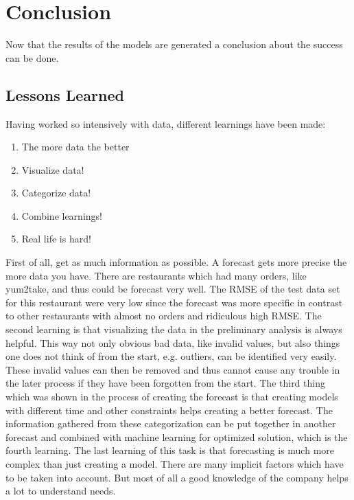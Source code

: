 \chapter{Conclusion}\label{chapter:Conclusion}
Now that the results of the models are generated a conclusion about the success can be done.
\section{Lessons Learned}
Having worked so intensively with data, different learnings have been made:

\begin{enumerate}
\item The more data the better
\item Visualize data!
\item Categorize data!
\item Combine learnings!
\item Real life is hard!
\end{enumerate}

First of all, get as much information as possible. A forecast gets more precise the more data you have. There are restaurants which had many orders, like yum2take, and thus could be forecast very well. The RMSE of the test data set for this restaurant were very low since the forecast was more specific in contrast to other restaurants with almost no orders and ridiculous high RMSE.\newline
The second learning is that visualizing the data in the preliminary analysis is always helpful. This way not only obvious bad data, like invalid values, but also things one does not think of from the start, e.g. outliers, can be identified very easily. These invalid values can then be removed and thus cannot cause any trouble in the later process if they have been forgotten from the start.\newline
The third thing which was shown in the process of creating the forecast is that creating models with different time and other constraints helps creating a better forecast. The information gathered from these categorization can be put together in another forecast and combined with machine learning for optimized solution, which is the fourth learning.\newline
The last learning of this task is that forecasting is much more complex than just creating a model. There are many implicit factors which have to be taken into account. But most of all a good knowledge of the company helps a lot to understand needs.
